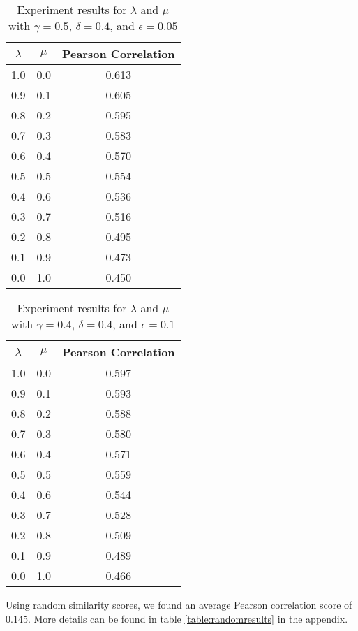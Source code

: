 \documentclass{article}
\begin{document}
\begin{table}[h!]
\centering
\begin{tabular}{|c|c||c|}
	\hline
	$\lambda$ & $\mu$ & Pearson Correlation \\
	\hline
	1.0 & 0.0 & 0.613 \\
	0.9 & 0.1 & 0.605 \\
	0.8 & 0.2 & 0.595 \\
	0.7 & 0.3 & 0.583 \\
	0.6 & 0.4 & 0.570 \\
	0.5 & 0.5 & 0.554 \\
	0.4 & 0.6 & 0.536 \\
	0.3 & 0.7 & 0.516 \\
	0.2 & 0.8 & 0.495 \\
	0.1 & 0.9 & 0.473 \\
	0.0 & 1.0 & 0.450 \\
	\hline
\end{tabular}
\caption{Experiment results for $\lambda$ and $\mu$ with $\gamma = 0.5$, $\delta = 0.4$, and $\epsilon = 0.05$}
\label{table:lambdamuresults1}
\end{table}

\begin{table}[h!]
\centering
\begin{tabular}{|c|c||c|}
	\hline
	$\lambda$ & $\mu$ & Pearson Correlation \\
	\hline
	1.0 & 0.0 & 0.597 \\
	0.9 & 0.1 & 0.593 \\
	0.8 & 0.2 & 0.588 \\
	0.7 & 0.3 & 0.580 \\
	0.6 & 0.4 & 0.571 \\
	0.5 & 0.5 & 0.559 \\
	0.4 & 0.6 & 0.544 \\
	0.3 & 0.7 & 0.528 \\
	0.2 & 0.8 & 0.509 \\
	0.1 & 0.9 & 0.489 \\
	0.0 & 1.0 & 0.466 \\
	\hline
\end{tabular}
\caption{Experiment results for $\lambda$ and $\mu$ with $\gamma = 0.4$, $\delta = 0.4$, and $\epsilon = 0.1$}
\label{table:lambdamuresults2}
\end{table}

Using random similarity scores, we found an average Pearson correlation score of 0.145. More details can be found in table \ref{table:randomresults} in the appendix.
\end{document}
